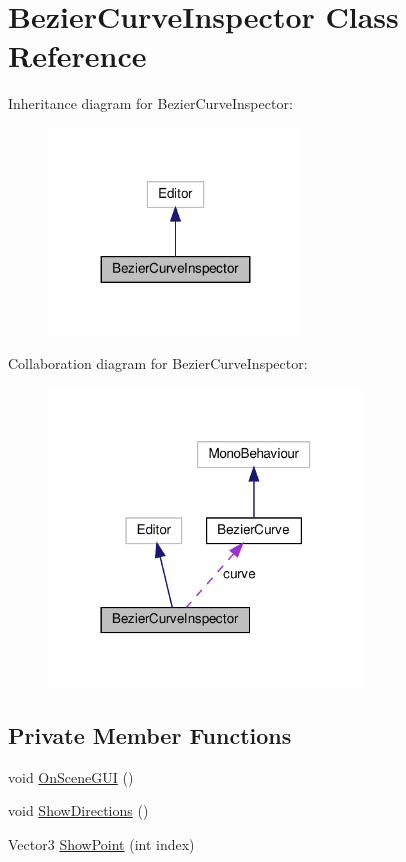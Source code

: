 \hypertarget{classBezierCurveInspector}{}\section{Bezier\+Curve\+Inspector Class Reference}
\label{classBezierCurveInspector}


Inheritance diagram for Bezier\+Curve\+Inspector\+:\nopagebreak
\begin{figure}[H]
\begin{center}
\leavevmode
\includegraphics[width=191pt]{classBezierCurveInspector__inherit__graph}
\end{center}
\end{figure}


Collaboration diagram for Bezier\+Curve\+Inspector\+:\nopagebreak
\begin{figure}[H]
\begin{center}
\leavevmode
\includegraphics[width=237pt]{classBezierCurveInspector__coll__graph}
\end{center}
\end{figure}
\subsection*{Private Member Functions}
\begin{DoxyCompactItemize}
\item 
void \hyperlink{classBezierCurveInspector_abe87f2d75f12adc52633e1d9ba483e32}{On\+Scene\+G\+UI} ()
\item 
void \hyperlink{classBezierCurveInspector_a586dff51b6f0a328f1d4df96fb4bcea6}{Show\+Directions} ()
\item 
Vector3 \hyperlink{classBezierCurveInspector_aa9ed65ee21a6d05f6ed51760fc5d4c08}{Show\+Point} (int index)
\end{DoxyCompactItemize}
